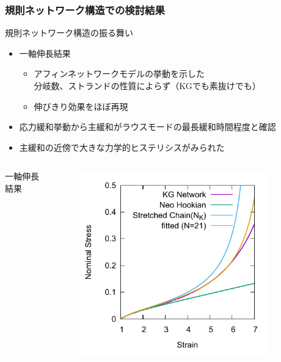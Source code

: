 \documentclass[11pt, dvipdfmx]{beamer}
\begin{document}
\begin{frame}
\frametitle{規則ネットワーク構造での検討結果}

\vspace{-2mm}
\small
\begin{alertblock}{規則ネットワーク構造の振る舞い}
\begin{itemize}
\item
一軸伸長結果
	\begin{itemize}
	\item
	\alert{アフィンネットワークモデルの挙動}を示した\\\alert{分岐数、ストランドの性質によらず}（KGでも素抜けでも）
	\item
	伸びきり効果をほぼ再現
	\end{itemize}
\item
応力緩和挙動から主緩和が\alert{ラウスモードの最長緩和時間程度}と確認
\item
主緩和の近傍で大きな\alert{力学的ヒステリシス}がみられた
\end{itemize}
\end{alertblock}
\begin{columns}[totalwidth=1\textwidth]
\scriptsize
一軸伸長結果
\vspace{-5mm}
\begin{figure}
\centering
\includegraphics[width=0.9\textwidth]{./fig/SS_Kuhn.pdf}
\end{figure}

\end{columns}
\end{frame}
\end{document}
